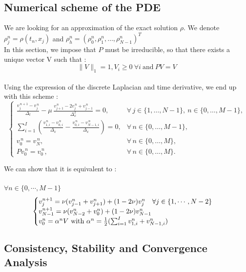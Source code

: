 \documentclass{article}
\begin{document}
\subsection{Numerical scheme of the PDE}

We are looking for an approximation of the exact solution $\rho$. We denote $\rho_j^n = \rho(t_n, x_j)$ and $\rho_h^n = (\rho_0^n, \rho_1^n, \ldots, \rho_{N-1}^n)^T$\\

In this section, we impose that $P$ must be irreducible, so that there exists a unique vector V such that :
\[ \|V\|_1 = 1, V_i \geq 0 \ \forall i \ \text{and} \ PV = V\] \\
Using the expression of the discrete Laplacian and time derivative, we end up with this scheme :   \\

\[
\begin{cases}
\displaystyle
\frac{v_{j}^{\,n+1} - v_{j}^{\,n}}{\Delta_t}
- \mu\,\frac{v_{j+1}^{\,n} - 2v_{j}^{\,n} + v_{j-1}^{\,n}}{\Delta_x^2} = 0,
& \forall\, j \in \{1,\dots,N-1\},\ n \in \{0,\dots,M-1\}, \\[8pt]

\displaystyle
\sum_{i=1}^I \left(\frac{v_{1,i}^{\,n} - v_{0,i}^{\,n}}{\Delta_x}
- \frac{v_{0,i}^{\,n} - v_{N-1,i}^{\,n}}{\Delta_x}\right) = 0,
& \forall\, n \in \{0,\dots,M-1\}, \\[8pt]

v_{0}^{\,n} = v_{N}^{\,n}, & \forall\, n \in \{0,\dots,M\}, \\[4pt]

P v_{0}^{\,n} = v_{0}^{\,n}, & \forall\, n \in \{0,\dots,M\}.
\end{cases}
\]



We can show that it is equivalent to :\\
\\
$\forall n \in \{0, \cdots, M-1\}$\\
\[
\begin{cases}
    v_j^{n+1} = \nu(v_{j-1}^n + v_{j+1}^n) + (1 - 2\nu)v_j^n \ \ \ \forall j \in \{1, \cdots, N-2\}\\
    v_{N-1}^{n+1} = \nu(v_{N-2}^n + v_{0}^n) + (1 - 2\nu)v_{N-1}^n \\
    v_0^n = \alpha^n V \ \text{with} \ \alpha^n = \frac{1}{2}(\sum_{i=1}^Iv_{1,i}^n + v_{N-1, i}^n)
\end{cases} \\
\]

 
\subsection{Consistency, Stability and Convergence Analysis}
\end{document}
